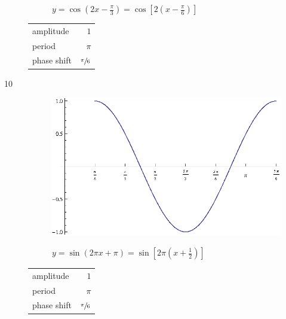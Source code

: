 \documentclass{exam}
\begin{document}
\begin{description}
\begin{figure}[H]
          $y = \cos \left( 2x - \frac{\pi}{3} \right) = \cos \left[ 2 \left( x - \frac{\pi}{6} \right) \right]$
        \end{figure}

        \begin{tabular}[H]{lr}
          \toprule
          amplitude   & $1$ \\
          period      & $\pi$ \\
          phase shift & $\sfrac{\pi}{6}$ \\
          \bottomrule
        \end{tabular}

      \item[10]
        \begin{figure}[H]
          \centering
          \includegraphics[scale=0.9]{example08.eps}

          $y = \sin \left( 2 \pi x + \pi \right) = \sin \left[ 2 \pi \left( x + \frac{1}{2} \right) \right]$
        \end{figure}

        \begin{tabular}[H]{lr}
          \toprule
          amplitude   & $1$ \\
          period      & $\pi$ \\
          phase shift & $\sfrac{\pi}{6}$ \\
          \bottomrule
        \end{tabular}

  \end{description}
\end{document}
